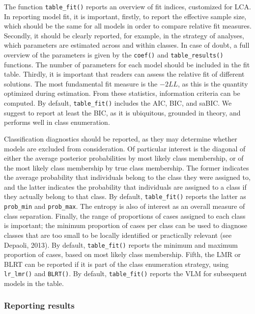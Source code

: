 \documentclass[
  ,man,floatsintext]{apa6}
\begin{document}
The function \texttt{table\_fit()} reports an overview of fit indices, customized for LCA.
In reporting model fit, it is important, firstly, to report the effective sample size, which should be the same for all models in order to compare relative fit measures.
Secondly, it should be clearly reported,
for example, in the strategy of analyses,
which parameters are estimated across and within classes.
In case of doubt, a full overview of the parameters is given by the \texttt{coef()} and \texttt{table\_results()} functions.
The number of parameters for each model should be included in the fit table.
Thirdly, it is important that readers can assess the relative fit of different solutions.
The most fundamental fit measure is the \(-2LL\),
as this is the quantity optimized during estimation.
From these statistics, information criteria can be computed.
By default, \texttt{table\_fit()} includes the AIC, BIC, and saBIC.
We suggest to report at least the BIC, as it is ubiquitous, grounded in theory, and performs well in class enumeration.

Classification diagnostics should be reported,
as they may determine whether models are excluded from consideration.
Of particular interest is the diagonal of either the average posterior probabilities by most likely class membership,
or of the most likely class membership by true class membership.
The former indicates the average probability that individuals belong to the class they were assigned to,
and the latter indicates the probability that individuals are assigned to a class if they actually belong to that class.
By default, \texttt{table\_fit()} reports the latter as \texttt{prob\_min} and \texttt{prob\_max}.
The entropy is also of interest as an overall measure of class separation.
Finally, the range of proportions of cases assigned to each class is important;
the minimum proportion of cases per class can be used to diagnose classes that are too small to be locally identified or practically relevant (see Depaoli, 2013).
By default, \texttt{table\_fit()} reports the minimum and maximum proportion of cases,
based on most likely class membership.
Fifth, the LMR or BLRT can be reported if it is part of the class enumeration strategy, using \texttt{lr\_lmr()} and \texttt{BLRT()}.
By default, \texttt{table\_fit()} reports the VLM for subsequent models in the table.

\hypertarget{reporting-results}{%
\subsubsection{Reporting results}\label{reporting-results}}
\end{document}
